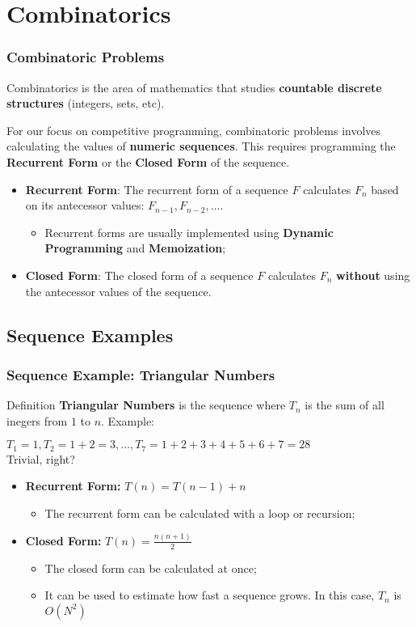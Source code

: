 \section{Combinatorics}
\begin{frame}
  \frametitle{Combinatoric Problems}
    Combinatorics is the area of mathematics that studies {\bf countable discrete structures} (integers, sets, etc).\bigskip

    For our focus on competitive programming, combinatoric problems involves calculating the values of {\bf numeric sequences}. This requires programming the {\bf Recurrent Form} or the {\bf Closed Form} of the sequence.\bigskip


    \begin{itemize}
    \item {\bf Recurrent Form}: The recurrent form of a sequence $F$ calculates $F_n$ based on its antecessor values: $F_{n-1}, F_{n-2},\ldots$.
    \begin{itemize}
      \item Recurrent forms are usually implemented using {\bf Dynamic Programming} and {\bf Memoization};
    \end{itemize}

    \item {\bf Closed Form}: The closed form of a sequence $F$ calculates $F_n$ {\bf without} using the antecessor values of the sequence.
    \end{itemize}
\end{frame}

\subsection{Sequence Examples}
\begin{frame}
  \frametitle{Sequence Example: Triangular Numbers}
  \begin{block}{Definition}
    {\bf Triangular Numbers} is the sequence where $T_n$ is the sum of all inegers from $1$ to $n$. Example:\medskip

    $T_1=1, T_2=1+2=3, \ldots, T_7=1+2+3+4+5+6+7=28$\\
    Trivial, right?
  \end{block}\bigskip

  \begin{itemize}
    \item {\bf Recurrent Form:} $T(n) = T(n-1) + n$
    \begin{itemize}
      \item The recurrent form can be calculated with a loop or recursion;
    \end{itemize}\bigskip
    \item {\bf Closed Form:} $T(n) = \frac{n(n+1)}{2}$
    \begin{itemize}
      \item The closed form can be calculated at once;
      \item It can be used to estimate how fast a sequence grows. In this case, $T_n$ is $O(N^2)$
    \end{itemize}
  \end{itemize}
\end{frame}

